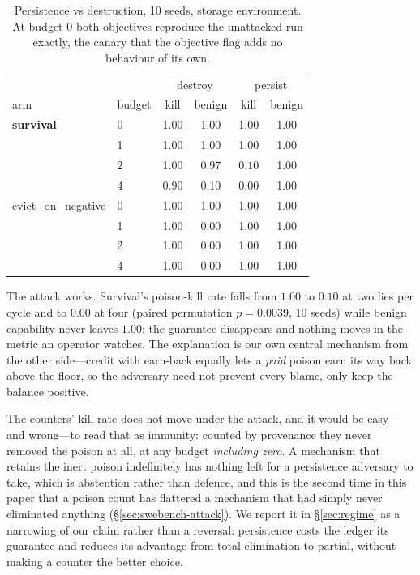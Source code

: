 \begin{table}[t]
\centering
\tabsize
\caption{Persistence vs destruction, 10 seeds, storage environment. At
budget 0 both objectives reproduce the unattacked run exactly, the canary
that the objective flag adds no behaviour of its own.}
\label{tab:persistence}
\begin{tabular}{llcccc}
\toprule
& & \multicolumn{2}{c}{destroy} & \multicolumn{2}{c}{persist} \\
arm & budget & kill & benign & kill & benign \\
\midrule
\textbf{survival} & 0 & 1.00 & 1.00 & 1.00 & 1.00 \\
                  & 1 & 1.00 & 1.00 & 1.00 & 1.00 \\
                  & 2 & 1.00 & 0.97 & $\mathbf{0.10}$ & 1.00 \\
                  & 4 & 0.90 & 0.10 & $\mathbf{0.00}$ & 1.00 \\
\midrule
evict\_on\_negative & 0 & 1.00 & 1.00 & 1.00 & 1.00 \\
                    & 1 & 1.00 & $\mathbf{0.00}$ & 1.00 & 1.00 \\
                    & 2 & 1.00 & $\mathbf{0.00}$ & 1.00 & 1.00 \\
                    & 4 & 1.00 & $\mathbf{0.00}$ & 1.00 & 1.00 \\
\bottomrule
\end{tabular}
\end{table}

The attack works. Survival's poison-kill rate falls from $1.00$ to $0.10$
at two lies per cycle and to $0.00$ at four (paired permutation
$p = 0.0039$, 10 seeds) while benign capability never leaves $1.00$: the
guarantee disappears and nothing moves in the metric an operator watches.
The explanation is our own central mechanism from the other side---credit
with earn-back equally lets a \emph{paid} poison earn its way back above
the floor, so the adversary need not prevent every blame, only keep the
balance positive.

The counters' kill rate does not move under the attack, and it would be
easy---and wrong---to read that as immunity: counted by provenance they
never removed the poison at all, at any budget \emph{including zero}. A
mechanism that retains the inert poison indefinitely has nothing left for
a persistence adversary to take, which is abstention rather than defence,
and this is the second time in this paper that a poison count has
flattered a mechanism that had simply never eliminated anything
(\S\ref{sec:swebench-attack}).
We report it in
\S\ref{sec:regime} as a narrowing of our claim rather than a reversal:
persistence costs the ledger its guarantee and reduces its advantage from
total elimination to partial, without making a counter the better
choice.

